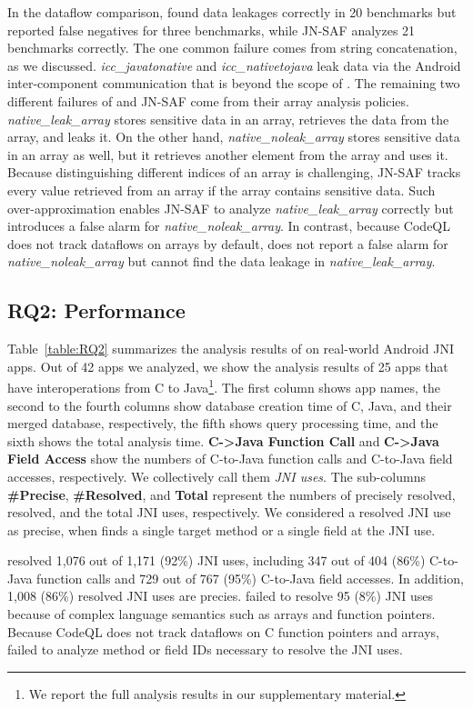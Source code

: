 In the dataflow comparison, \ours found data leakages correctly in 20
benchmarks but reported false negatives for three benchmarks, while JN-SAF
analyzes 21 benchmarks correctly. 
The one common failure comes from string concatenation, as we discussed.
{\it icc\_javatonative} and {\it icc\_nativetojava} leak data via the Android
inter-component communication that is beyond the scope of \ours.
The remaining two different failures of \ours and JN-SAF come from their array analysis policies.
{\it native\_leak\_array} stores sensitive data in an array, retrieves the data from the array,
and leaks it.  On the other hand, {\it native\_noleak\_array} stores sensitive
data in an array as well, but it retrieves another element from the array and uses it.
Because distinguishing different indices of an array is challenging, JN-SAF
tracks every value retrieved from an array if the array contains sensitive data.
Such over-approximation enables JN-SAF to analyze {\it
native\_leak\_array} correctly but introduces a false alarm for {\it
native\_noleak\_array}.  In contrast, because CodeQL does not
track dataflows on arrays by default, \ours does not report
a false alarm for {\it native\_noleak\_array} but cannot find the data leakage in {\it
native\_leak\_array}.


\subsection{RQ2: Performance}
Table~\ref{table:RQ2} summarizes the analysis results of \ours on real-world Android JNI apps.
Out of 42 apps we analyzed, we show the analysis
results of 25 apps that have interoperations from C to Java\footnote{We
report the full analysis results in our supplementary material.}.
The first column shows app names, the second to the fourth columns show database
creation time of C, Java, and their merged database, respectively, the fifth
shows query processing time, and the sixth shows the total analysis time.
{\bf C->Java Function Call} and {\bf C->Java Field Access}
show the numbers of C-to-Java function calls and
C-to-Java field accesses, respectively. We collectively call them
\emph{JNI uses}.
The sub-columns {\bf \#Precise}, {\bf \#Resolved}, and {\bf Total}
represent the numbers of precisely resolved, 
resolved, and the total JNI uses, respectively.
We considered a resolved JNI use as precise, when \ours finds a single target method
or a single field at the JNI use.


\ours resolved 1,076 out of 1,171 (92\%) JNI uses, including
347 out of 404 (86\%) C-to-Java function calls and 729 out of 767 (95\%)
C-to-Java field accesses. In addition, 1,008 (86\%) resolved JNI uses are precies.
\ours failed to resolve 95 (8\%) JNI uses because
of complex language semantics such as arrays and function pointers. Because
CodeQL does not track dataflows on C function pointers and arrays,
\ours failed to analyze method or field IDs necessary to resolve the JNI uses.

